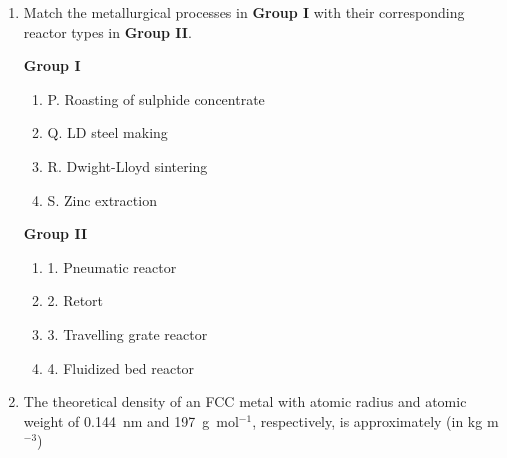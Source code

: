 \documentclass[journal,12pt,onecolumn]{IEEEtran}
\theoremstyle{remark}
\begin{document}
\begin{enumerate}
    \item Match the metallurgical processes in \textbf{Group I} with their corresponding reactor types in \textbf{Group II}.
    
    \begin{minipage}{0.45\textwidth}
    \textbf{Group I}
    \begin{enumerate}
    \item P. Roasting of sulphide concentrate
    \item Q. LD steel making
    \item R. Dwight-Lloyd sintering
    \item S. Zinc extraction
    \end{enumerate}
    \end{minipage}%
    \begin{minipage}{0.45\textwidth}
    \textbf{Group II}
    \begin{enumerate}
    \item 1. Pneumatic reactor
    \item 2. Retort
    \item 3. Travelling grate reactor
    \item 4. Fluidized bed reactor
    \end{enumerate}
    \end{minipage}
    \hfill{}
    \begin{enumerate}[label=(\Alph*)]
    \end{enumerate}


    \item The theoretical density of an FCC metal with atomic radius and atomic weight of 0.144~nm and 197~g~mol$^{-1}$, respectively, is approximately (in kg m$^{-3}$)
    \hfill{}
    \begin{enumerate}[label=(\Alph*)]
    \end{enumerate}


\end{enumerate}
\end{document}
